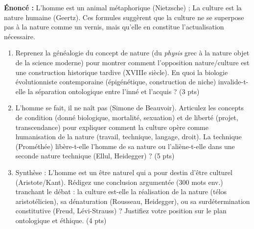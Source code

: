 \documentclass[11pt]{article}
\begin{document}
\begin{exercice}
\textbf{Énoncé :} \og L'homme est un animal métaphorique \fg{} (Nietzsche) ; \og La culture est la nature humaine \fg{} (Geertz). Ces formules suggèrent que la culture ne se superpose pas à la nature comme un vernis, mais qu'elle en constitue l'actualisation nécessaire.

\begin{enumerate}
    \item Reprenez la généalogie du concept de \og nature \fg{} (du \textit{physis} grec à la nature objet de la science moderne) pour montrer comment l'opposition nature/culture est une construction historique tardive (XVIIIe siècle). En quoi la biologie évolutionniste contemporaine (épigénétique, construction de niche) invalide-t-elle la séparation ontologique entre l'inné et l'acquis ? (3 pts)
    \item \og L'homme se fait, il ne naît pas \fg{} (Simone de Beauvoir). Articulez les concepts de \og condition \fg{} (donné biologique, mortalité, sexuation) et de \og liberté \fg{} (projet, transcendance) pour expliquer comment la culture opère comme \og humanisation de la nature \fg{} (travail, technique, langage, droit). La technique (Prométhée) libère-t-elle l'homme de sa nature ou l'aliène-t-elle dans une \og seconde nature \fg{} technique (Ellul, Heidegger) ? (5 pts)
    \item Synthèse : \og L'homme est un être naturel qui a pour destin d'être culturel \fg{} (Aristote/Kant). Rédigez une conclusion argumentée (300 mots env.) tranchant le débat : la culture est-elle la \og réalisation \fg{} de la nature (télos aristotélicien), sa \og dénaturation \fg{} (Rousseau, Heidegger), ou sa \og surdétermination \fg{} constitutive (Freud, Lévi-Strauss) ? Justifiez votre position sur le plan ontologique et éthique. (4 pts)
\end{enumerate}
\end{exercice}
\end{document}
